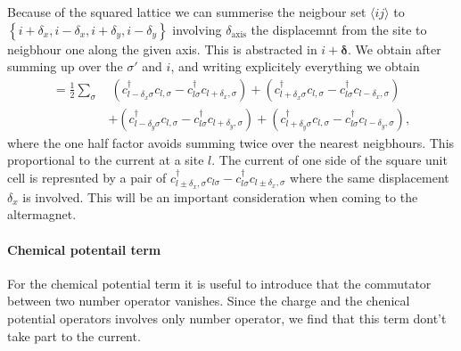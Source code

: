\documentclass[../main.tex]{subfile}
\begin{document}
Because of the squared lattice we can summerise the neigbour set $\langle ij\rangle$ to $\left\{ i + \delta_x , i - \delta_x, i + \delta_y, i - \delta_y   \right\}$ involving
$\delta_{\text{axis}}$ the displacemnt from the site to neigbhour one along the given axis. This is abstracted in $i+ \bm{\delta}$.
We obtain after summing up over the $\sigma'$ and $i$, and writing explicitely everything we obtain 
\begin{equation}\label{Eq:CurrentHoppingCommu}
    \begin{aligned}
        =\frac{1}{2} \sum_{\sigma} 
       &~(c_{l-\delta_x\sigma}^{\dagger}c_{l,\sigma} -c_{l\sigma}^{\dagger}c_{l+\delta_x,\sigma})  
       +(c_{l+\delta_x\sigma}^{\dagger}c_{l,\sigma} -c_{l\sigma}^{\dagger}c_{l-\delta_x,\sigma})\\
       &+(c_{l-\delta_y\sigma}^{\dagger}c_{l,\sigma} -c_{l\sigma}^{\dagger}c_{l+\delta_y,\sigma})
       +(c_{l+\delta_y\sigma}^{\dagger}c_{l,\sigma} -c_{l\sigma}^{\dagger}c_{l-\delta_y,\sigma}),
\end{aligned}
\end{equation}
where the one half factor avoids summing twice over the nearest neigbhours. This proportional to the current at a site $l$.
The current of one side of the square unit cell is represnted by a pair of $c_{l\pm\delta_x,\sigma}^{\dagger}c_{l\sigma} -c_{l\sigma}^{\dagger}c_{l\pm\delta_x,\sigma}$
where the same displacement $\delta_x$ is involved. This will be an important consideration when coming to the altermagnet.\\

\paragraph{Chemical potentail term} For the chemical potential term it is useful to introduce that the commutator between two number operator vanishes. 
Since the charge and the chenical potential operators involves only number operator, we find that this term dont't take part
to the current.
\end{document}
